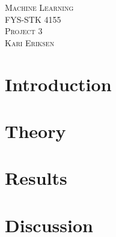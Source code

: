 \documentclass[a4paper,12pt, english]{article}
\begin{document}
\begin{titlepage}
\begin{center}
\textsc{\Large Machine Learning}\\[0.2cm]
\textsc{FYS-STK 4155}\\[1.0cm]
\textsc{\Large Project 3}\\[0.2cm]
\textsc{Kari Eriksen}\\[1.0cm]

\begin{abstract}

\end{abstract}

\end{center}
\end{titlepage}

\section*{Introduction}

\section*{Theory}

\section*{Results}

\section*{Discussion}
\end{document}
